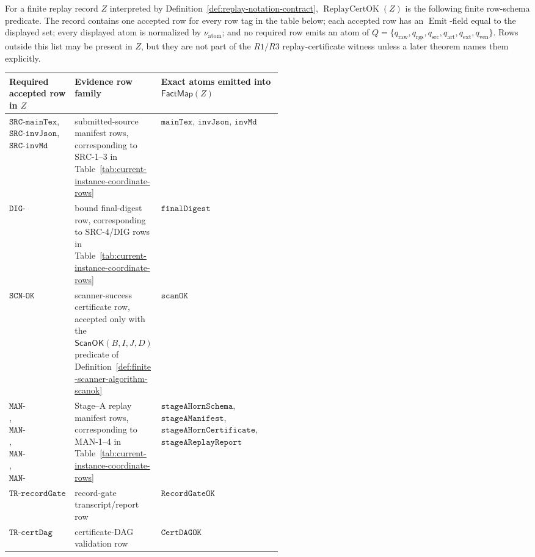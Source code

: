 \documentclass[runningheads]{llncs}
\newcommand{\ScanOK}{\mathsf{ScanOK}}
\newcommand{\FactMap}{\mathsf{FactMap}}
\newcommand{\rawBeginTokenCoord}{q_{\mathrm{raw}}}
\newcommand{\qlex}{\rawBeginTokenCoord}
\newcommand{\qrgs}{q_{\mathrm{rgs}}}
\newcommand{\qsrc}{q_{\mathrm{src}}}
\newcommand{\qart}{q_{\mathrm{art}}}
\newcommand{\qext}{q_{\mathrm{ext}}}
\newcommand{\qven}{q_{\mathrm{ven}}}
\newcommand{\normalizeAtom}{\nu_{\mathrm{atom}}}
\begin{document}
\begin{definition}
\label{def:replay-cert-ok}
For a finite replay record \(Z\) interpreted by
Definition~\ref{def:replay-notation-contract},
\(\operatorname{ReplayCertOK}(Z)\) is the following finite row-schema
predicate.  The record contains one accepted row for every row tag in the table
below; each accepted row has an \(\operatorname{Emit}\)-field equal to the
displayed set; every displayed atom is normalized by \(\normalizeAtom\); and no
required row emits an atom of
\(Q=\{\qlex,\qrgs,\qsrc,\qart,\qext,\qven\}\).  Rows outside this list may be
present in \(Z\), but they are not part of the \(R1/R3\) replay-certificate
witness unless a later theorem names them explicitly.
\begin{center}
\small
\setlength{\tabcolsep}{2.0pt}
\begin{tabularx}{0.98\linewidth}{@{}L{0.24\linewidth}L{0.28\linewidth}Y@{}}
\toprule
Required accepted row in \(Z\) & Evidence row family & Exact atoms emitted into \(\FactMap(Z)\)\\
\midrule
\(\texttt{SRC-mainTex}\), \(\texttt{SRC-invJson}\),
\(\texttt{SRC-invMd}\) &
submitted-source manifest rows, corresponding to SRC-1--3 in
Table~\ref{tab:current-instance-coordinate-rows} &
\(\texttt{mainTex}\), \(\texttt{invJson}\), \(\texttt{invMd}\)\\
\addlinespace
\(\texttt{DIG-finalDigest}\) &
bound final-digest row, corresponding to SRC-4/DIG rows in
Table~\ref{tab:current-instance-coordinate-rows} &
\(\texttt{finalDigest}\)\\
\addlinespace
\(\texttt{SCN-OK}\) &
scanner-success certificate row, accepted only with the
\(\ScanOK(B,I,J,D)\) predicate of
Definition~\ref{def:finite-scanner-algorithm-scanok} &
\(\texttt{scanOK}\)\\
\addlinespace
\(\texttt{MAN-stageAHornSchema}\),
\(\texttt{MAN-stageAManifest}\),
\(\texttt{MAN-stageAHornCertificate}\),
\(\texttt{MAN-stageAReplayReport}\) &
Stage--A replay manifest rows, corresponding to MAN-1--4 in
Table~\ref{tab:current-instance-coordinate-rows} &
\(\texttt{stageAHornSchema}\), \(\texttt{stageAManifest}\),
\(\texttt{stageAHornCertificate}\),
\(\texttt{stageAReplayReport}\)\\
\addlinespace
\(\texttt{TR-recordGate}\) &
record-gate transcript/report row &
\(\texttt{RecordGateOK}\)\\
\addlinespace
\(\texttt{TR-certDag}\) &
certificate-DAG validation row &
\(\texttt{CertDAGOK}\)\\

\end{tabularx}
\end{center}
\end{definition}
\end{document}
